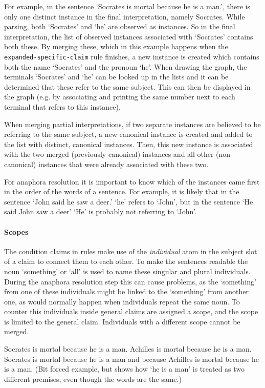 For example, in the sentence `Socrates is mortal because he is a man.', there is only one distinct instance in the final interpretation, namely Socrates. While parsing, both `Socrates' and `he' are observed as instances. So in the final interpretation, the list of observed instances associated with `Socrates' contains both these. By merging these, which in this example happens when the \texttt{expanded-specific-claim} rule finishes, a new instance is created which contains both the name `Socrates' and the pronoun `he'. When drawing the graph, the terminals `Socrates' and `he' can be looked up in the lists and it can be determined that these refer to the same subject. This can then be displayed in the graph (e.g. by associating and printing the same number next to each terminal that refers to this instance).

When merging partial interpretations, if two separate instances are believed to be referring to the same subject, a new canonical instance is created and added to the list with distinct, canonical instances. Then, this new instance is associated with the two merged (previously canonical) instances and all other (non-canonical) instances that were already associated with these two.

For anaphora resolution it is important to know which of the instances came first in the order of the words of a sentence. For example, it is likely that in the sentence `John said he saw a deer.' `he' refers to `John', but in the sentence `He said John saw a deer' `He' is probably not referring to `John'.

\paragraph{Scopes}
The condition claims in rules make use of the \emph{individual} atom in the subject slot of a claim to connect them to each other. To make the sentences readable the noun `something' or `all' is used to name these singular and plural individuals. During the anaphora resolution step this can cause problems, as the `something' from one of these individuals might be linked to the `something' from another one, as would normally happen when individuals repeat the same noun. To counter this individuals inside general claims are assigned a scope, and the scope is limited to the general claim. Individuals with a different scope cannot be merged.

\begin{exe}
	\ex\label{gramscopes} Socrates is mortal because he is a man. Achilles is mortal because he is a man.
	\ex Socrates is mortal because he is a man and because Achilles is mortal because he is a man. (Bit forced example, but shows how `he is a man' is treated as two different premises, even though the words are the same.)
\end{exe}


